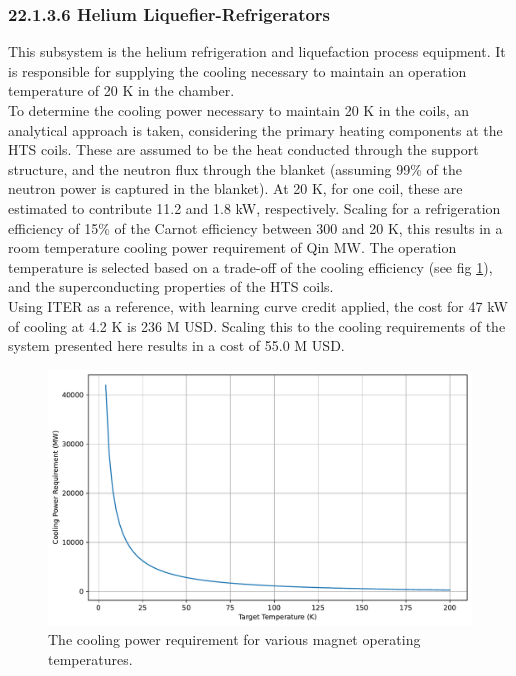 \subsubsection*{22.1.3.6 Helium Liquefier-Refrigerators }This subsystem is the helium refrigeration and liquefaction process equipment. It is responsible for supplying the cooling necessary to maintain an operation temperature of 20 K in the chamber. \\

To determine the cooling power necessary to maintain 20 K in the coils, an analytical approach is taken, considering the primary heating components at the HTS coils. These are assumed to be the heat conducted through the support structure, and the neutron flux through the blanket (assuming 99\% of the neutron power is captured in the blanket). At 20 K, for one coil, these are estimated to contribute 11.2 and 1.8 kW, respectively. Scaling for a refrigeration efficiency of 15\% of the Carnot efficiency between 300 and 20 K, this results in a room temperature cooling power requirement of Qin MW. The operation temperature is selected based on a trade-off of the cooling efficiency (see fig \ref{fig:cool_eff}), and the superconducting properties of the HTS coils.\\

Using ITER as a reference, with learning curve credit applied, the cost for 47 kW of cooling at 4.2 K is 236 M USD. Scaling this to the cooling requirements of the system presented here results in a cost of 55.0 M USD. \\

\begin{figure}[h]
    \centering
    \includegraphics[width=0.75\linewidth]{Figures/cooling_efficiency.pdf}
    \caption{The cooling power requirement for various magnet operating temperatures.}
    \label{fig:cool_eff}
\end{figure}


